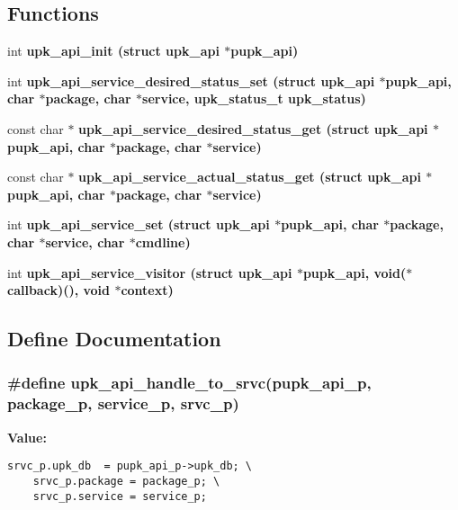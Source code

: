 \subsection*{Functions}
\begin{CompactItemize}
\item 
int \bf{upk\_\-api\_\-init} (struct \bf{upk\_\-api} $\ast$pupk\_\-api)
\item 
int \bf{upk\_\-api\_\-service\_\-desired\_\-status\_\-set} (struct \bf{upk\_\-api} $\ast$pupk\_\-api, char $\ast$package, char $\ast$service, upk\_\-status\_\-t upk\_\-status)
\item 
const char $\ast$ \bf{upk\_\-api\_\-service\_\-desired\_\-status\_\-get} (struct \bf{upk\_\-api} $\ast$pupk\_\-api, char $\ast$package, char $\ast$service)
\item 
const char $\ast$ \bf{upk\_\-api\_\-service\_\-actual\_\-status\_\-get} (struct \bf{upk\_\-api} $\ast$pupk\_\-api, char $\ast$package, char $\ast$service)
\item 
int \bf{upk\_\-api\_\-service\_\-set} (struct \bf{upk\_\-api} $\ast$pupk\_\-api, char $\ast$package, char $\ast$service, char $\ast$cmdline)
\item 
int \bf{upk\_\-api\_\-service\_\-visitor} (struct \bf{upk\_\-api} $\ast$pupk\_\-api, void($\ast$callback)(), void $\ast$context)
\end{CompactItemize}


\subsection{Define Documentation}
\subsubsection{\setlength{\rightskip}{0pt plus 5cm}\#define upk\_\-api\_\-handle\_\-to\_\-srvc(pupk\_\-api\_\-p, package\_\-p, service\_\-p, srvc\_\-p)}\label{upk__api_8c_33894e8dc142f4829e6f210dcb8e991f}


\textbf{Value:}

\begin{Code}\begin{verbatim}srvc_p.upk_db  = pupk_api_p->upk_db; \
    srvc_p.package = package_p; \
    srvc_p.service = service_p;
\end{verbatim}\end{Code}
